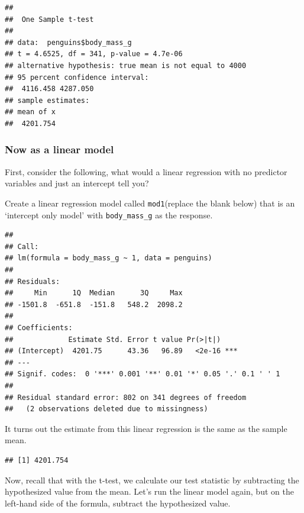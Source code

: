 \documentclass[
  openany]{book}
\newenvironment{Shaded}{\begin{snugshade}}{\end{snugshade}}
\newcommand{\AttributeTok}[1]{\textcolor[rgb]{0.77,0.63,0.00}{#1}}
\newcommand{\CommentTok}[1]{\textcolor[rgb]{0.56,0.35,0.01}{\textit{#1}}}
\newcommand{\ConstantTok}[1]{\textcolor[rgb]{0.00,0.00,0.00}{#1}}
\newcommand{\FunctionTok}[1]{\textcolor[rgb]{0.00,0.00,0.00}{#1}}
\newcommand{\NormalTok}[1]{#1}
\newcommand{\SpecialCharTok}[1]{\textcolor[rgb]{0.00,0.00,0.00}{#1}}
\begin{document}
\begin{verbatim}
## 
##  One Sample t-test
## 
## data:  penguins$body_mass_g
## t = 4.6525, df = 341, p-value = 4.7e-06
## alternative hypothesis: true mean is not equal to 4000
## 95 percent confidence interval:
##  4116.458 4287.050
## sample estimates:
## mean of x 
##  4201.754
\end{verbatim}

\hypertarget{now-as-a-linear-model}{%
\subsubsection{Now as a linear model}\label{now-as-a-linear-model}}

First, consider the following, what would a linear regression with no predictor variables and just an intercept tell you?

Create a linear regression model called \texttt{mod1}(replace the blank below) that is an `intercept only model' with \texttt{body\_mass\_g} as the response.

\begin{verbatim}
## 
## Call:
## lm(formula = body_mass_g ~ 1, data = penguins)
## 
## Residuals:
##     Min      1Q  Median      3Q     Max 
## -1501.8  -651.8  -151.8   548.2  2098.2 
## 
## Coefficients:
##             Estimate Std. Error t value Pr(>|t|)    
## (Intercept)  4201.75      43.36   96.89   <2e-16 ***
## ---
## Signif. codes:  0 '***' 0.001 '**' 0.01 '*' 0.05 '.' 0.1 ' ' 1
## 
## Residual standard error: 802 on 341 degrees of freedom
##   (2 observations deleted due to missingness)
\end{verbatim}

It turns out the estimate from this linear regression is the same as the sample mean.

\begin{Shaded}
\end{Shaded}

\begin{verbatim}
## [1] 4201.754
\end{verbatim}

Now, recall that with the t-test, we calculate our test statistic by subtracting the hypothesized value from the mean. Let's run the linear model again, but on the left-hand side of the formula, subtract the hypothesized value.
\end{document}
